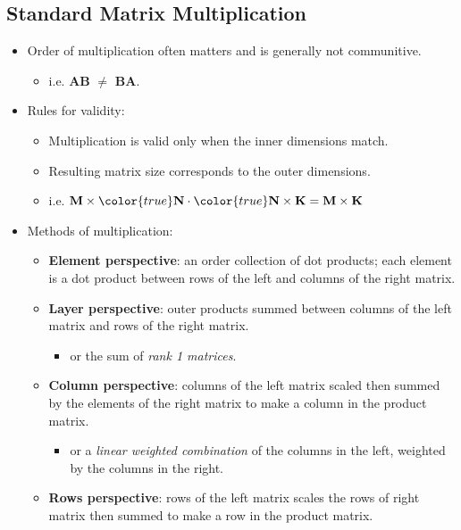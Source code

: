 \documentclass[12pt,a4paper]{article}
\begin{document}
\subsection{Standard Matrix Multiplication}
\begin{itemize}
    \item Order of multiplication often matters and is generally {\color{false}not communitive}.
        \begin{itemize}
            \item i.e. \textbf{AB} $\neq$ \textbf{BA}.
        \end{itemize}
    \item Rules for validity:
        \begin{itemize}
            \item Multiplication is {\color{o-Sun}valid} only when the {\color{o-Sun}inner dimensions} match.
            \item Resulting matrix {\color{o-Sun}size} corresponds to the {\color{o-Sun}outer dimensions}.
            \item i.e. \(\textbf{M}\times {\color{true}\textbf{N}} \cdot {\color{true}\textbf{N}}\times\textbf{K}= \textbf{M}\times\textbf{K}\) 
        \end{itemize}
    \item Methods of multiplication:
        \begin{itemize}
            \item \textbf{Element perspective}: an order collection of dot products; each element is a dot product between {\color{o-Sun}rows of the left} and {\color{o-Sun}columns of the right} matrix. 
            \item \textbf{Layer perspective}: outer products summed between columns of the left matrix and rows of the right matrix.
                \begin{itemize}
                    \item or the sum of \textit{rank 1 matrices}.
                \end{itemize}
            \item \textbf{Column perspective}: columns of the left matrix scaled then summed by the elements of the right matrix to make a column in the product matrix.
                \begin{itemize}
                    \item or a \textit{linear weighted combination} of the columns in the left, weighted by the columns in the right.
                \end{itemize}
            \item \textbf{Rows perspective}: rows of the left matrix scales the rows of right matrix then summed to make a row in the product matrix.
        \end{itemize}
\end{itemize}
\end{document}
